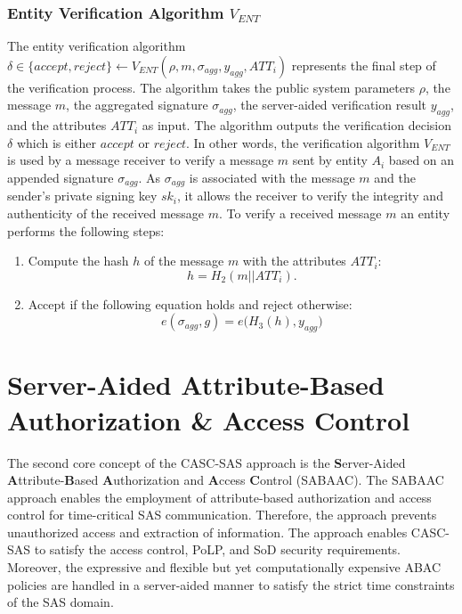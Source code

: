 \subsubsection{Entity Verification Algorithm $V_{ENT}$}
The entity verification algorithm $\delta \in \{accept, reject\} \leftarrow V_{ENT}(\rho, m, \sigma_{agg}, y_{agg}, ATT_i)$ represents the final step of the verification process.
The algorithm takes the public system parameters $\rho$, the message $m$, the aggregated signature $\sigma_{agg}$, the server-aided verification result $y_{agg}$, and the attributes $ATT_i$ as input.
The algorithm outputs the verification decision $\delta$ which is either $accept$ or $reject$.
In other words, the verification algorithm $V_{ENT}$ is used by a message receiver to verify a message $m$ sent by entity $A_i$ based on an appended signature $\sigma_{agg}$.
As $\sigma_{agg}$ is associated with the message $m$ and the sender's private signing key $sk_i$, it allows the receiver to verify the integrity and authenticity of the received message $m$.
To verify a received message $m$ an entity performs the following steps:
\begin{enumerate}
    \item Compute the hash $h$ of the message $m$ with the attributes $ATT_i$:
    \[
        h = H_2(m || ATT_i).
    \]
    \item Accept if the following equation holds and reject otherwise:
    \[
        e(\sigma_{agg}, g) {=} e\big(H_3(h), y_{agg}\big)
    \]
\end{enumerate}

\section{Server-Aided Attribute-Based Authorization \& Access Control}
\label{sec:approach:sabaac}
The second core concept of the CASC-SAS approach is the \textbf{S}erver-Aided \textbf{A}ttribute-\textbf{B}ased \textbf{A}uthorization and \textbf{A}ccess \textbf{C}ontrol (SABAAC).
The SABAAC approach enables the employment of attribute-based authorization and access control for time-critical SAS communication.
Therefore, the approach prevents unauthorized access and extraction of information.
The approach enables CASC-SAS to satisfy the access control, PoLP, and SoD security requirements.
Moreover, the expressive and flexible but yet computationally expensive ABAC policies are handled in a server-aided manner to satisfy the strict time constraints of the SAS domain.

